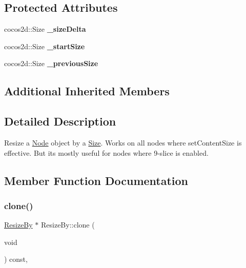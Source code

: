 \subsection*{Protected Attributes}
\begin{DoxyCompactItemize}
\item 
\mbox{\label{classResizeBy_a3c908e8f5e58b6fe4223c286c40bc409}} 
cocos2d\+::\+Size {\bfseries \+\_\+size\+Delta}
\item 
\mbox{\label{classResizeBy_ab5433f1a0286a931947966b7a56fd259}} 
cocos2d\+::\+Size {\bfseries \+\_\+start\+Size}
\item 
\mbox{\label{classResizeBy_ab311269ba63920a7f9c19bd8bad958a3}} 
cocos2d\+::\+Size {\bfseries \+\_\+previous\+Size}
\end{DoxyCompactItemize}
\subsection*{Additional Inherited Members}


\subsection{Detailed Description}
Resize a \hyperlink{classNode}{Node} object by a \hyperlink{classSize}{Size}. Works on all nodes where set\+Content\+Size is effective. But it\textquotesingle{}s mostly useful for nodes where 9-\/slice is enabled. 

\subsection{Member Function Documentation}
\mbox{\label{classResizeBy_a77547588c32d16183c06c175963475fc}} 
\subsubsection{\texorpdfstring{clone()}{clone()}}
{\footnotesize\ttfamily \hyperlink{classResizeBy}{Resize\+By} $\ast$ Resize\+By\+::clone (\begin{DoxyParamCaption}\item[{void}]{ }\end{DoxyParamCaption}) const\hspace{0.3cm}{\ttfamily [override]}, {\ttfamily [virtual]}}

